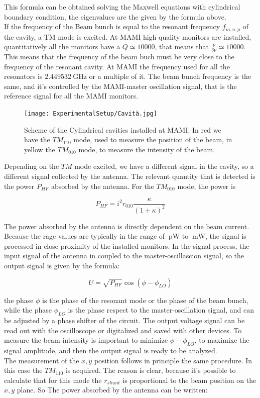 This formula can be obtained solving the Maxwell equations with cylindrical boundary condition, the eigenvalues are the given by the formula above. \\
If the frequency of the Beam bunch is equal to the resonant frequency $f_{m,n,p}$ of the cavity, a TM mode is excited. At MAMI high quality monitors are installed, quantitatively all the monitors have a $Q \simeq 10000$, that means that $\frac{\nu}{\delta \nu} \simeq 10000$. This means that the frequency of the beam buch must be very close to the frequency of the resonant cavity. At MAMI the frequency used for all the resonators is $\SI{2.449532}{\giga \hertz}$ or a multiple of it. The beam bunch frequency is the same, and it's controlled by the MAMI-master oscillation signal, that is the reference signal for all the MAMI monitors.

\begin{figure}[hbtp]
\centering
\texttt{[image: ExperimentalSetup/Cavità.jpg]}
\caption{Scheme of the Cylindrical cavities installed at MAMI. In red we have the $TM_{110}$ mode, used to measure the position of the beam, in yellow the $TM_{010}$ mode, to measure the intensity of the beam.}
\end{figure}

Depending on the $TM$ mode excited, we have a different signal in the cavity, so a different signal collected by the antenna. The relevant quantity that is detected is the power $P_{HF}$ absorbed by the antenna. For the $TM_{010}$ mode, the power is 

\begin{equation}
P_{HF} = i^{2} r_{010} \frac{\kappa}{(1 + \kappa)^{2}}
\end{equation}

The power absorbed by the antenna is directly dependent on the beam current. Because the rage values are typically in the range of $\SI{}{\pico \watt}$ to $\SI{}{\milli \watt }$, the signal is processed in close proximity of the installed monitors. In the signal process, the input signal of the antenna in coupled to the master-oscillascion signal, so the output signal is given by the formula:

\begin{equation}
U = \sqrt{P_{HF}} \cos(\phi - \phi_{LO})
\end{equation}

the phase $\phi$ is the phase of the resonant mode or the phase of the beam bunch, while the phase $\phi_{LO}$ is the phase respect to the master-oscillation signal, and can be adjusted by a phase shifter of the circuit. The output voltage signal can be read out with the oscilloscope or digitalized and saved with other devices. To measure the beam intensity is important to minimize $\phi - \phi_{LO}$, to maximixe the signal amplitude, and then the output signal is ready to be analyzed. \\
The measurement of the $x,y$ position follows in principle the same procedure. In this case the $TM_{110}$ is acquired. The reason is clear, because it's possible to calculate that for this mode the $r_{shunt}$ is proportional to the beam position on the $x,y$ plane. So The power absorbed by the antenna can be written:

